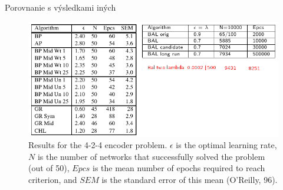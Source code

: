 \documentclass[xcolor=dvipsnames]{beamer}
\begin{document}
\begin{frame}{Porovnanie s výsledkami iných}

  \begin{figure}[h!]  
    \centering
    \includegraphics[scale=0.4]{img/comparison_both.png} 
    \caption{{\tiny Results for the 4-2-4 encoder problem. $\epsilon$ is the optimal learning rate, $N$ is the number of networks that successfully solved the problem (out of 50), $Epcs$ is the mean number of epochs required to reach criterion, and $SEM$ is the standard error of this mean (O'Reilly, 96).}} 
  \end{figure} 
  \begin{center}
    
  \end{center} 
\end{frame}
\end{document}
